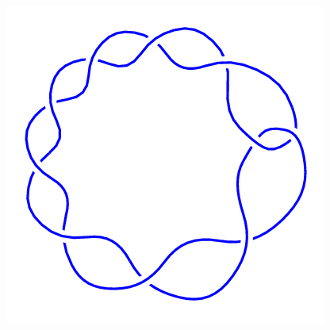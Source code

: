 \begin{figure}[H]
\begin{minipage}[b]{.18\linewidth}
	\end{minipage}
	\begin{minipage}[b]{.18\linewidth}
		\centering
		\includegraphics[width=\linewidth]{../data/10_1.png}
	\end{minipage}
\end{figure}
